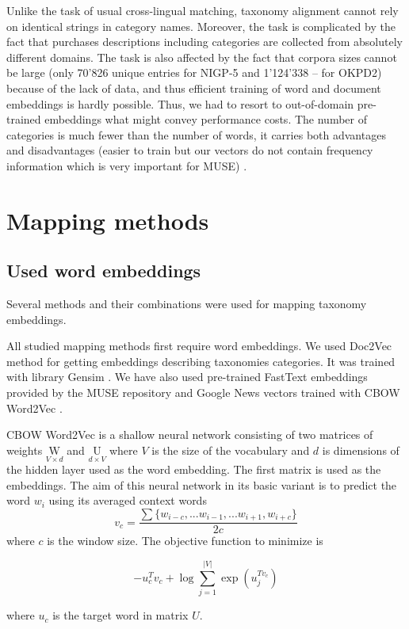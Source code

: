 \documentclass[11pt,a4paper]{article}
\begin{document}
Unlike the task of usual cross-lingual matching, taxonomy alignment cannot rely on identical strings in category names. Moreover, the task is complicated by the fact that purchases descriptions including categories are collected from absolutely different domains. The task is also affected by the fact that corpora sizes cannot be large (only 70'826 unique entries for NIGP-5 and 1'124'338 -- for OKPD2) because of the lack of data, and thus efficient training of word and document embeddings is hardly possible. Thus, we had to resort to out-of-domain pre-trained embeddings what might convey performance costs. The number of categories is much fewer than the number of words, it carries both advantages and disadvantages (easier to train but our vectors do not contain frequency information which is very important for MUSE) \cite{ruder-muse-limitations}.

\section{Mapping methods}

\subsection{Used word embeddings}

Several methods and their combinations were used for mapping taxonomy embeddings.

All studied mapping methods first require word embeddings. We used Doc2Vec \cite{doc2vec} method for getting embeddings describing taxonomies categories. It was trained with library Gensim \cite{gensim}. We have also used pre-trained FastText \cite{fasttext} embeddings provided by the MUSE repository and Google News vectors trained with CBOW Word2Vec \cite{mikolov2013}. 

CBOW Word2Vec is a shallow neural network consisting of two matrices of weights $\underset{V\times d}{\mathrm{W}}$ and $\underset{d\times V}{\mathrm{U}}$ where $V$ is the size of the vocabulary and $d$ is dimensions of the hidden layer used as the word embedding.
The first matrix is used as the embeddings.
The aim of this neural network in its basic variant is to predict the word $w_i$ using its averaged context words
$$v_c = \dfrac{\sum\{w_{i-c},...w_{i-1},...w_{i+1}, w_{i+c}\}}{2c}$$
where $c$ is the window size. The objective function to minimize is

$$ -u_c^Tv_c + \log \sum_{j=1}^{|V|}\exp(u_j^{Tv_c})$$

where $u_c$ is the target word in matrix $U$.
\end{document}
